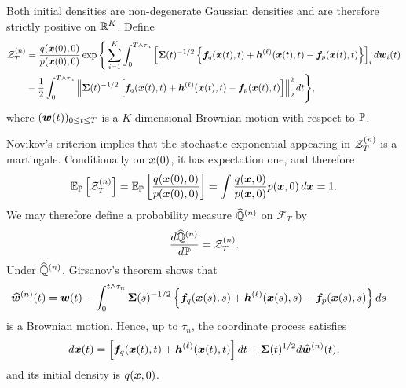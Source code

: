 Both initial densities are non-degenerate Gaussian densities and are therefore strictly positive on $\mathbb{R}^K$. Define
{\small
\begin{equation*}
\begin{aligned}
    \mathcal{Z}_T^{(n)}
    &= \frac{q(\boldsymbol{x}(0),0)}{p(\boldsymbol{x}(0),0)} \exp\Bigg\{ \sum_{i=1}^K \int_0^{T\wedge\tau_n} \left[ \boldsymbol{\Sigma}(t)^{-1/2} \left\{ \boldsymbol{f}_q(\boldsymbol{x}(t),t) +\boldsymbol{h}^{(\ell)}(\boldsymbol{x}(t),t) -\boldsymbol{f}_p(\boldsymbol{x}(t),t) \right\} \right]_i d\boldsymbol{w}_i(t)\\
    &-\frac{1}{2} \int_0^{T\wedge\tau_n} \left\| \boldsymbol{\Sigma}(t)^{-1/2} \left[ \boldsymbol{f}_q(\boldsymbol{x}(t),t)  +\boldsymbol{h}^{(\ell)}(\boldsymbol{x}(t),t)-\boldsymbol{f}_p(\boldsymbol{x}(t),t) \right] \right\|_2^2dt\Bigg\},
\end{aligned}
\end{equation*}
}
where $(\boldsymbol{w}(t))_{0\leq t\leq T}$ is a $K$-dimensional Brownian motion with respect to $\mathbb{P}$.

Novikov's criterion implies that the stochastic exponential appearing in $\mathcal{Z}_T^{(n)}$ is a martingale. Conditionally on $\boldsymbol{x}(0)$, it has expectation one, and therefore
\begin{equation*}
    \mathbb{E}_{\mathbb{P}}\left[\mathcal{Z}_T^{(n)}\right]
    = \mathbb{E}_{\mathbb{P}}\left[ \frac{q(\boldsymbol{x}(0),0)}{p(\boldsymbol{x}(0),0)}   \right] = \int \frac{q(\boldsymbol{x},0)}{p(\boldsymbol{x},0)} p(\boldsymbol{x},0)\,d\boldsymbol{x} =1.
\end{equation*}
We may therefore define a probability measure
$\widehat{\mathbb{Q}}^{(n)}$ on $\mathcal F_T$ by
\begin{equation*}
    \frac{d\widehat{\mathbb{Q}}^{(n)}}{d\mathbb{P}} = \mathcal{Z}_T^{(n)}.
\end{equation*}
Under $\widehat{\mathbb{Q}}^{(n)}$, Girsanov's theorem shows that
\begin{equation*}
\begin{aligned}
    \widehat{\boldsymbol{w}}^{(n)}(t) &= \boldsymbol{w}(t) - \int_0^{t\wedge\tau_n} \boldsymbol{\Sigma}(s)^{-1/2} \left\{ \boldsymbol{f}_q(\boldsymbol{x}(s),s) +\boldsymbol{h}^{(\ell)}(\boldsymbol{x}(s),s) -\boldsymbol{f}_p(\boldsymbol{x}(s),s) \right\}ds
\end{aligned}
\end{equation*}
is a Brownian motion.
Hence, up to $\tau_n$, the coordinate process satisfies
\begin{equation*}
    d\boldsymbol{x}(t) = \left[ \boldsymbol{f}_q(\boldsymbol{x}(t),t) +\boldsymbol{h}^{(\ell)}(\boldsymbol{x}(t),t) \right]dt + \boldsymbol{\Sigma}(t)^{1/2} d\widehat{\boldsymbol{w}}^{(n)}(t),
\end{equation*}
and its initial density is $q(\boldsymbol{x},0)$.

